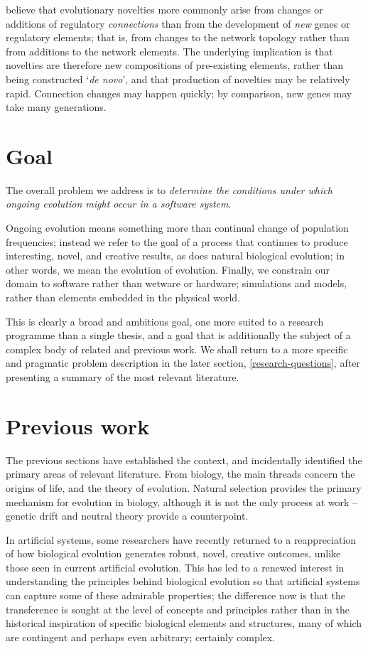 \autocite{Prudhomme:2007ax} believe that evolutionary novelties more
commonly arise from changes or additions of regulatory
\emph{connections} than from the development of \emph{new} genes or
regulatory elements; that is, from changes to the network topology
rather than from additions to the network elements. The underlying
implication is that novelties are therefore new compositions of
pre-existing elements, rather than being constructed `\emph{de novo}',
and that production of novelties may be relatively rapid. Connection
changes may happen quickly; by comparison, new genes may take many generations.

\section{Goal}
The overall problem we address is to \textit{determine the conditions under which ongoing evolution might occur in a software system}. 

Ongoing evolution means something more than continual change of population frequencies; instead we refer to the goal of a process that continues to produce interesting, novel, and creative results, as does natural biological evolution; in other words, we mean the evolution of evolution. Finally, we constrain our domain to software rather than wetware or hardware; simulations and models, rather than elements embedded in the physical world.

This is clearly a broad and ambitious goal, one more suited to a research programme than a single thesis, and a goal that is additionally the subject of a complex body of related and previous work. We shall return to a more specific and pragmatic problem description in the later section, \ref{research-questions}, after presenting a summary of the most relevant literature.
	
\section{Previous work}
The previous sections have established the context, and incidentally identified the primary areas of relevant literature. From biology, the main threads concern the origins of life, and the theory of evolution. Natural selection provides the primary mechanism for evolution in biology, although it is not the only process at work -- genetic drift and neutral theory \cite{Kimura:1968uq} provide a counterpoint. 

In artificial systems, some researchers have recently returned to a reappreciation of how biological evolution generates robust, novel, creative outcomes, unlike those seen in current artificial evolution. This has led to a renewed interest in understanding the principles behind biological evolution so that artificial systems can capture some of these admirable properties; the difference now is that the transference is sought at the level of concepts and principles rather than in the historical inspiration of specific biological elements and structures, many of which are contingent and perhaps even arbitrary; certainly complex.

